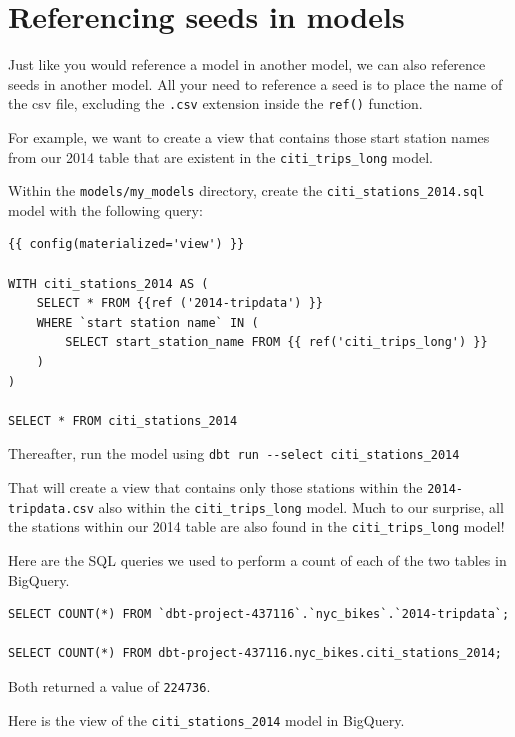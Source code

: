 \documentclass[
]{book}
\begin{document}
\hypertarget{referencing-seeds-in-models}{%
\section{Referencing seeds in models}\label{referencing-seeds-in-models}}

Just like you would reference a model in another model, we can also reference seeds in another model. All your need to reference a seed is to place the name of the csv file, excluding the \texttt{.csv} extension inside the \texttt{ref()} function.

For example, we want to create a view that contains those start station names from our 2014 table that are existent in the \texttt{citi\_trips\_long} model.

Within the \texttt{models/my\_models} directory, create the \texttt{citi\_stations\_2014.sql} model with the following query:

\begin{verbatim}
{{ config(materialized='view') }}

WITH citi_stations_2014 AS (
    SELECT * FROM {{ref ('2014-tripdata') }}
    WHERE `start station name` IN (
        SELECT start_station_name FROM {{ ref('citi_trips_long') }}
    )
)

SELECT * FROM citi_stations_2014
\end{verbatim}

Thereafter, run the model using \texttt{dbt\ run\ -\/-select\ citi\_stations\_2014}

That will create a view that contains only those stations within the \texttt{2014-tripdata.csv} also within the \texttt{citi\_trips\_long} model. Much to our surprise, all the stations within our 2014 table are also found in the \texttt{citi\_trips\_long} model!

Here are the SQL queries we used to perform a count of each of the two tables in BigQuery.

\begin{verbatim}
SELECT COUNT(*) FROM `dbt-project-437116`.`nyc_bikes`.`2014-tripdata`;

SELECT COUNT(*) FROM dbt-project-437116.nyc_bikes.citi_stations_2014;
\end{verbatim}

Both returned a value of \texttt{224736}.

Here is the view of the \texttt{citi\_stations\_2014} model in BigQuery.
\end{document}
